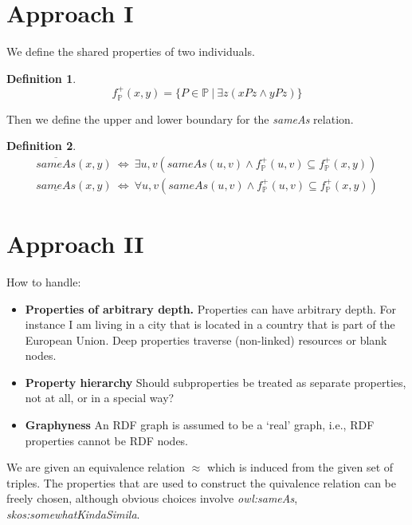 \documentclass[11pt,a4paper,notitlepage,onecolumn,twoside]{article}
\newtheorem{definition}{Definition}
\begin{document}
\section{Approach I}

We define the shared properties of two individuals.

\begin{definition}
\begin{equation}
f^{+}_{\mathbb{P}}(x,y) = \{ P \in \mathbb{P} \  \vert \  \exists z (xPz \land yPz) \}
\end{equation}
\end{definition}

Then we define the upper and lower boundary for the \emph{sameAs} relation.

\begin{definition}
\begin{align}
\overline{sameAs}(x,y) \  \iff \  \exists u,v (sameAs(u,v) \land
    f^{+}_{\mathbb{P}}(u,v) \subseteq f^{+}_{\mathbb{P}}(x,y)) \\
\underline{sameAs}(x,y) \  \iff \  \forall u,v (sameAs(u,v) \land
    f^{+}_{\mathbb{P}}(u,v) \subseteq f^{+}_{\mathbb{P}}(x,y))
\end{align}
\end{definition}

\section{Approach II}

How to handle:
\begin{itemize}
\item \textbf{Properties of arbitrary depth.} Properties can have arbitrary
      depth. For instance I am living in a city that is located in a country
      that is part of the European Union. Deep properties traverse
      (non-linked) resources or blank nodes.
\item \textbf{Property hierarchy} Should subproperties be treated
      as separate properties, not at all, or in a special way?
\item \textbf{Graphyness} An RDF graph is assumed to be a `real' graph,
      i.e., RDF properties cannot be RDF nodes.
\end{itemize}

We are given an equivalence relation $\approx$ which is induced
from the given set of triples. The properties that are used to construct
the quivalence relation can be freely chosen, although obvious choices
involve \emph{owl:sameAs}, \emph{skos:somewhatKindaSimila}.
\end{document}
